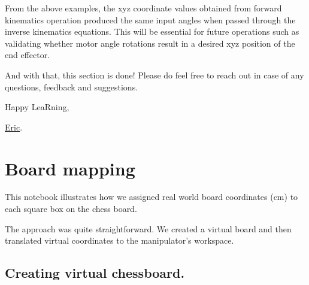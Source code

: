 \documentclass[
  letterpaper,
  DIV=11,
  numbers=noendperiod]{scrreprt}
\begin{document}
From the above examples, the xyz coordinate values obtained from forward
kinematics operation produced the same input angles when passed through
the inverse kinematics equations. This will be essential for future
operations such as validating whether motor angle rotations result in a
desired xyz position of the end effector.

And with that, this section is done! Please do feel free to reach out in
case of any questions, feedback and suggestions.

Happy LeaRning,

\href{https://twitter.com/ericntay}{Eric}.

\hypertarget{board-mapping}{%
\chapter{Board mapping}\label{board-mapping}}

This notebook illustrates how we assigned real world board coordinates
(cm) to each square box on the chess board.

The approach was quite straightforward. We created a virtual board and
then translated virtual coordinates to the manipulator's workspace.

\hypertarget{creating-virtual-chessboard.}{%
\section{Creating virtual
chessboard.}\label{creating-virtual-chessboard.}}
\end{document}
